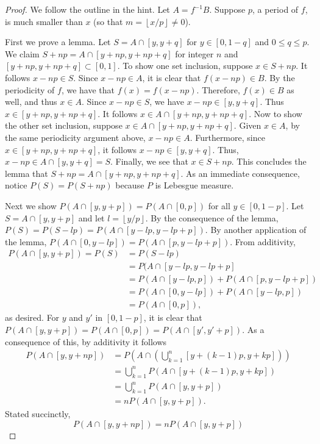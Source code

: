 \documentclass[letterpaper, 12pt]{article}
\newcommand{\lf}{\left\lfloor}
\newcommand{\rf}{\right\rfloor}
\begin{document}
\begin{proof}
We follow the outline in the hint. Let $A = f^{-1}B$. Suppose $p$, a period of $f$, is much smaller than $x$ (so that $m =  \lf x/p \rf \neq 0$). 

First we prove a lemma. Let $S = A \cap [y,y+q]$ for $y \in [0, 1 - q]$ and $0 \leq q \leq p$. 
We claim $S +np = A \cap [y + np, y +np + q]$ for integer $n$ and $[y + np, y +np + q] \subset [0,1]$. 
To show one set inclusion, suppose $x \in S + np$. 
It follows $x - np \in S$. 
Since $x - np \in A$, it is clear that $f(x - np) \in B$.
By the periodicity of $f$, we have that $f(x) = f(x - np)$.
Therefore, $f(x) \in B$ as well, and thus $x \in A$.
Since $x - np \in S$, we have $x - np \in [y, y+q]$. 
Thus $x \in [y +np, y + np + q]$.
It follows $x \in A \cap [y +np, y + np + q]$.
Now to show the other set inclusion, suppose $x \in A \cap [y +np, y + np + q]$.
Given $x \in A$, by the same periodicity argument above, $x - np \in A$.
Furthermore, since $x \in [y +np, y + np + q]$, it follows $x - np \in [y, y+q]$.
Thus, $x - np \in A \cap [y, y + q] = S$.
Finally, we see that $x \in S + np$.
This concludes the lemma that $S + np = A \cap [y +np, y + np + q]$.
As an immediate consequence, notice $P(S) = P(S + np)$ because $P$ is Lebesgue measure.


Next we show $P(A \cap [y,y+p]) = P(A \cap [0,p])$ for all $y \in [0,1-p]$. 
Let $S = A \cap [y,y+p]$ and let $l = \lf y/p \rf$. 
By the consequence of the lemma, $P(S) = P(S - lp) = P(A \cap [y - lp, y -lp+p])$. 
By another application of the lemma, $P(A \cap [0, y -lp]) = P(A \cap [p, y - lp + p])$. From additivity,
\begin{align*}
P(A \cap [y,y+p]) = P(S) &= P(S - lp) \\
&= P(A \cap [y - lp, y -lp+p] \\
&= P(A \cap [ y -lp, p]) + P(A \cap [p, y - lp + p]) \\
&= P(A \cap [0, y - lp]) + P(A \cap [ y -lp, p]) \\
&= P(A \cap [0,p])
\text{,}
\end{align*}
as desired. 
For $y$ and $y'$ in $[0, 1 - p]$, it is clear that $P(A \cap [y,y+p]) = P(A \cap [0,p]) = P(A \cap [y',y'+p])$. 
As a consequence of this, by additivity it follows 
\begin{align*}
P(A \cap [y, y + np]) &= P\left(A \cap \left( \bigcup_{k = 1}^n [y + (k -1)p, y+kp]\right)\right) \\
&= \bigcup_{k = 1}^n P\left(A \cap  [y + (k -1)p, y+kp]\right) \\
&= \bigcup_{k = 1}^n P\left(A \cap  [y , y+p]\right) \\
&= n P\left(A \cap  [y , y+p]\right)
\text{.}
\end{align*}
Stated succinctly, 
\begin{equation}
\label{np}
P(A \cap [y, y + np]) = n P(A \cap  [y , y+p])
\end{equation}


\end{proof}
\end{document}
